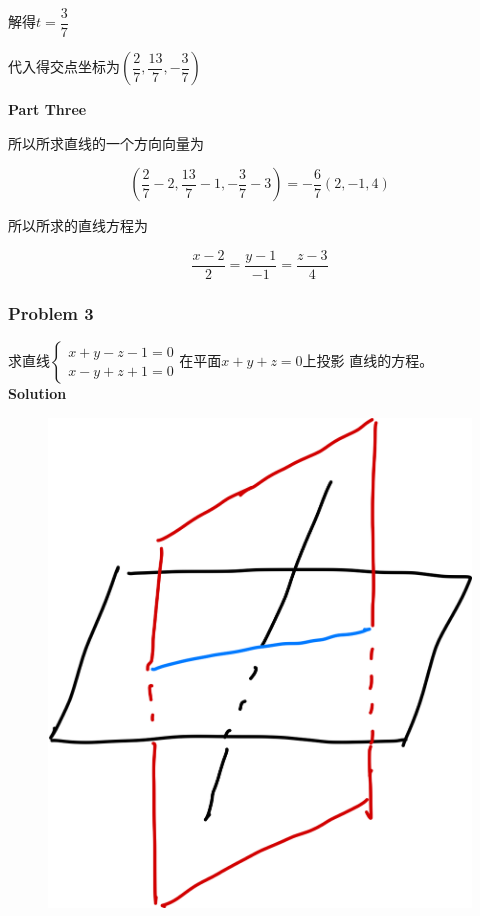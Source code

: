 \documentclass[12pt, a4paper]{article}
\numberwithin{equation}{section}
\begin{document}
    解得\(t=\dfrac{3}{7}\)

    代入得交点坐标为$\left(\dfrac{2}{7}, \dfrac{13}{7},-\dfrac{3}{7}\right)$

    \textbf{Part Three}

    所以所求直线的一个方向向量为

    $$
        \left(\frac{2}{7}-2, \frac{13}{7}-1,-\frac{3}{7}-3\right)=-\frac{6}{7}(2,-1,4)
    $$

    所以所求的直线方程为

    $$
        \frac{x-2}{2}=\frac{y-1}{-1}=\frac{z-3}{4}
    $$

\subsubsection{Problem 3}

    求直线$\left\{\begin{array}{l}x+y-z-1=0 \\ x-y+z+1=0\end{array}\right.$在平面\(x+y+z=0\)上投影
    直线的方程。
    \\

    \textbf{Solution}
    \\

    \begin{figure}
        \centering
        \includegraphics[scale=0.08]{"Chapter 08 images/pic2.png"}
        \label{pic2}
    \end{figure}
\end{document}
